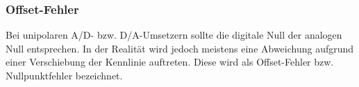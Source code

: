 \subsubsection{Offset-Fehler }
Bei unipolaren A/D- bzw. D/A-Umsetzern sollte die digitale Null der
analogen Null entsprechen. In der Realität wird jedoch meistens eine Abweichung
aufgrund einer Verschiebung der Kennlinie auftreten. Diese wird als
Offset-Fehler bzw. Nullpunktfehler bezeichnet.
\begin{figure}[!ht]
\begin{center}
\end{center}
\end{figure}

